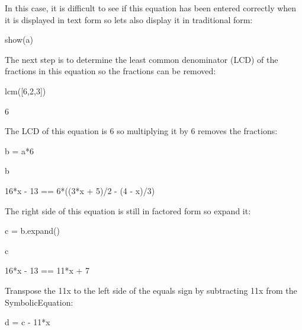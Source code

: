 \documentclass[12pt,twoside]{book}
\begin{document}
{\textquotedbl}{\textquotedbl}{\textquotedbl}

In this case, it is difficult to see if this equation has been entered correctly when it is displayed in text form so lets also display it in traditional form:

{\textquotedbl}{\textquotedbl}{\textquotedbl}

show(a)

{\textbar}


\bigskip



{\textquotedbl}{\textquotedbl}{\textquotedbl}

The next step is to determine the least common denominator (LCD) of the fractions in this equation so the fractions can be removed:

{\textquotedbl}{\textquotedbl}{\textquotedbl}

lcm([6,2,3])

{\textbar}

6


\bigskip

{\textquotedbl}{\textquotedbl}{\textquotedbl}

The LCD of this equation is 6 so multiplying it by 6 removes the fractions:

{\textquotedbl}{\textquotedbl}{\textquotedbl}

b = a*6

b

{\textbar}

16*x {}- 13 == 6*((3*x + 5)/2 {}- (4 {}- x)/3)


\bigskip

{\textquotedbl}{\textquotedbl}{\textquotedbl}

The right side of this equation is still in factored form so expand it:

{\textquotedbl}{\textquotedbl}{\textquotedbl}

c = b.expand()

c

{\textbar}

16*x {}- 13 == 11*x + 7


\bigskip

{\textquotedbl}{\textquotedbl}{\textquotedbl}

Transpose the 11x to the left side of the equals sign by subtracting 11x from the SymbolicEquation:

{\textquotedbl}{\textquotedbl}{\textquotedbl}

d = c {}- 11*x
\end{document}
